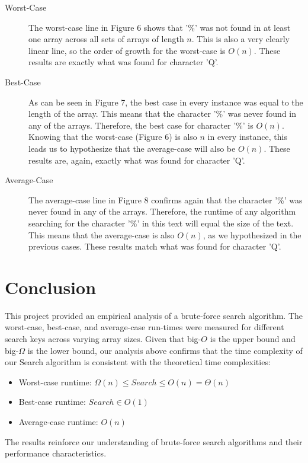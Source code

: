 \documentclass{article}
\begin{document}
\begin{description}
    \item[Worst-Case] The worst-case line in Figure 6 shows that '\%' was not found in at least one array across all sets of arrays of length $n$. This is also a very clearly linear line, so the order of growth for the worst-case is $O(n)$. These results are exactly what was found for character 'Q'. 
    \item[Best-Case] As can be seen in Figure 7, the best case in every instance was equal to the length of the array. This means that the character '\%' was never found in any of the arrays. Therefore, the best case for character '\%' is $O(n)$. Knowing that the worst-case (Figure 6) is also $n$ in every instance, this leads us to hypothesize that the average-case will also be $O(n)$. These results are, again, exactly what was found for character 'Q'.
    \item[Average-Case] The average-case line in Figure 8 confirms again that the character '\%' was never found in any of the arrays. Therefore, the runtime of any algorithm searching for the character '\%' in this text will equal the size of the text. This means that the average-case is also $O(n)$, as we hypothesized in the previous cases. These results match what was found for character 'Q'. 
\end{description}

\section{Conclusion}
This project provided an empirical analysis of a brute-force search algorithm. The worst-case, best-case, and average-case run-times were measured for different search keys across varying array sizes. Given that big-$O$ is the upper bound and big-$\Omega$ is the lower bound, our analysis above confirms that the time complexity of our Search algorithm is consistent with the theoretical time complexities:
	
    \begin{itemize}
        \item Worst-case runtime: \( \Omega(n) \leq Search \leq O(n) = \Theta(n) \)
	\item Best-case runtime: \( Search \in O(1) \)
	\item Average-case runtime: \( O(n) \)
    \end{itemize}
    
The results reinforce our understanding of brute-force search algorithms and their performance characteristics.
\end{document}
